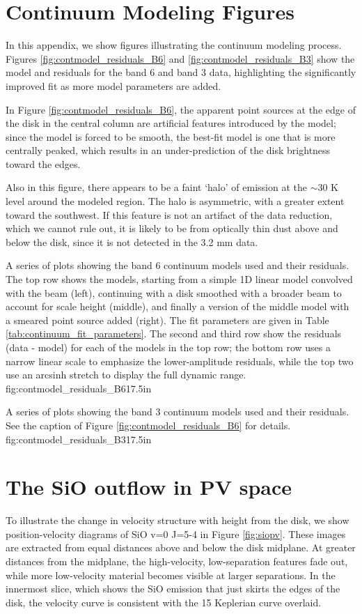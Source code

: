 \documentclass[twocolumn]{aastex61}
\begin{document}
\section{Continuum Modeling Figures}
\label{appendix:contmodel}
In this appendix, we show figures illustrating the continuum modeling process.
Figures \ref{fig:contmodel_residuals_B6} and \ref{fig:contmodel_residuals_B3}
show the model and residuals for the band 6 and band 3 data, highlighting the
significantly improved fit as more model parameters are added.

In Figure \ref{fig:contmodel_residuals_B6}, the apparent point sources at the
edge of the disk in the central column are artificial features introduced by
the model; since the model is forced to be smooth, the best-fit model is one
that is more centrally peaked, which results in an under-prediction of the disk
brightness toward the edges.  

Also in this figure, there appears to be a faint `halo' of emission at the
$\sim30$ K level around the modeled region.  The halo is asymmetric, with a
greater extent toward the southwest.  If this feature is not an artifact of the
data reduction, which we cannot rule out, it is likely to be from optically
thin dust above and below the disk, since it is not detected in the 3.2 mm data.


{A series of plots showing the band 6 continuum models used and their residuals.
The top row shows the models, starting from a simple 1D linear model convolved
with the beam (left), continuing with a disk smoothed with a broader beam to
account for scale height (middle), and finally a version of the middle model
with a smeared point source added (right).  The fit parameters are given in Table
\ref{tab:continuum_fit_parameters}.  The second and third row show the
residuals (data - model) for each of the models in the top row; the bottom row
uses a narrow linear scale to emphasize the lower-amplitude residuals, while
the top two use an arcsinh stretch to display the full dynamic range.
}
{fig:contmodel_residuals_B6}{1}{7.5in}


{A series of plots showing the band 3 continuum models used and their residuals.
See the caption of Figure \ref{fig:contmodel_residuals_B6} for details.
}
{fig:contmodel_residuals_B3}{1}{7.5in}


\section{The SiO outflow in PV space}
\label{sec:siopv}
To illustrate the change in velocity structure with height from the disk, 
we show position-velocity diagrams of SiO v=0 J=5-4 in Figure \ref{fig:siopv}.
These images are extracted from equal distances above and below
the disk midplane.  At greater distances from the midplane, the high-velocity,
low-separation features fade out, while more low-velocity material
becomes visible at larger separations.  In the innermost slice, which shows the
SiO emission that just skirts the edges of the disk, the velocity curve is 
consistent with the 15 \msun Keplerian curve overlaid.
\end{document}
